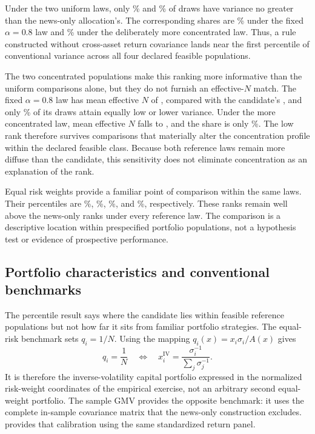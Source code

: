 Under the two uniform laws, only
\% and
\% of draws have variance no
greater than the news-only allocation's.
The corresponding shares are
\% under the fixed
$\alpha=0.8$ law and
\% under the deliberately
more concentrated law.
Thus, a rule constructed without cross-asset return covariance lands near the
first percentile of conventional variance across all four declared feasible
populations.

The two concentrated populations make this ranking more informative than the
uniform comparisons alone, but they do not furnish an effective-$N$ match.
The fixed $\alpha=0.8$ law has mean effective $N$ of
, compared with the
candidate's , and only
\% of its draws attain
equally low or lower variance.
Under the more concentrated law, mean effective $N$ falls to
, and the share is only
\%.
The low rank therefore survives comparisons that materially alter the
concentration profile within the declared feasible class.
Because both reference laws remain more diffuse than the candidate, this
sensitivity does not eliminate concentration as an explanation of the rank.

Equal risk weights provide a familiar point of comparison within the same laws.
Their percentiles are
\%,
\%,
\%, and
\%, respectively.
These ranks remain well above the news-only ranks under every reference law.
The comparison is a descriptive location within prespecified portfolio
populations, not a hypothesis test or evidence of prospective performance.

\subsection{Portfolio characteristics and conventional benchmarks}
\label{sec:news-variance-benchmark}

The percentile result says where the candidate lies within feasible reference
populations but not how far it sits from familiar portfolio strategies.
The equal-risk benchmark sets $q_i=1/N$.
Using the mapping $q_i(x)=x_i\sigma_i/A(x)$ gives
\[
  q_i=\frac1N
  \quad\Longleftrightarrow\quad
  x_i^{\mathrm{IV}}
  =\frac{\sigma_i^{-1}}{\sum_j\sigma_j^{-1}}.
\]
It is therefore the inverse-volatility capital portfolio expressed in the
normalized risk-weight coordinates of the empirical exercise, not an arbitrary
second equal-weight portfolio.
The sample GMV provides the opposite benchmark: it uses the complete in-sample
covariance matrix that the news-only construction excludes.
 provides that calibration using the same
standardized return panel.

